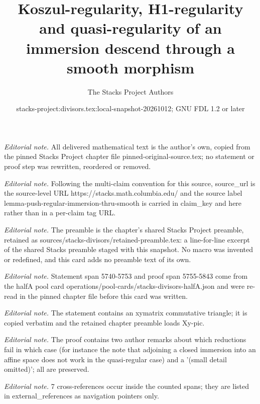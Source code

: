 \documentclass[10pt,a4paper]{amsart}
\title{Koszul-regularity, H1-regularity and quasi-regularity of an immersion descend through a smooth morphism}
\author{The Stacks Project Authors}
\date{stacks-project:divisors.tex:local-snapshot-20261012; GNU FDL 1.2 or later}
\theoremstyle{plain}
\theoremstyle{definition}
\theoremstyle{remark}
\numberwithin{equation}{subsection}
\begin{document}
\maketitle
\noindent\textit{Editorial note.} All delivered mathematical text is the author's own, copied from the pinned Stacks Project chapter file pinned-original-source.tex; no statement or proof step was rewritten, reordered or removed.\par\medskip
\noindent\textit{Editorial note.} Following the multi-claim convention for this source, source\_url is the source-level URL https://stacks.math.columbia.edu/ and the source label lemma-push-regular-immersion-thru-smooth is carried in claim\_key and here rather than in a per-claim tag URL.\par\medskip
\noindent\textit{Editorial note.} The preamble is the chapter's shared Stacks Project preamble, retained as sources/stacks-divisors/retained-preamble.tex: a line-for-line excerpt of the shared Stacks preamble staged with this snapshot. No macro was invented or redefined, and this card adds no preamble text of its own.\par\medskip
\noindent\textit{Editorial note.} Statement span 5740-5753 and proof span 5755-5843 come from the halfA pool card operations/pool-cards/stacks-divisors-halfA.json and were re-read in the pinned chapter file before this card was written.\par\medskip
\noindent\textit{Editorial note.} The statement contains an xymatrix commutative triangle; it is copied verbatim and the retained chapter preamble loads Xy-pic.\par\medskip
\noindent\textit{Editorial note.} The proof contains two author remarks about which reductions fail in which case (for instance the note that adjoining a closed immersion into an affine space does not work in the quasi-regular case) and a '(small detail omitted)'; all are preserved.\par\medskip
\noindent\textit{Editorial note.} 7 cross-references occur inside the counted spans; they are listed in external\_references as navigation pointers only.\par\medskip
\end{document}
